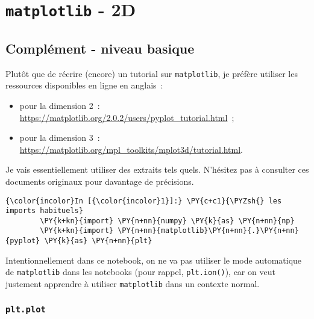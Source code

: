     
    
    
    

    

    \hypertarget{matplotlib---2d}{%
\section{\texorpdfstring{\texttt{matplotlib} -
2D}{matplotlib - 2D}}\label{matplotlib---2d}}

    \hypertarget{compluxe9ment---niveau-basique}{%
\subsection{Complément - niveau
basique}\label{compluxe9ment---niveau-basique}}

    Plutôt que de récrire (encore) un tutorial sur \texttt{matplotlib}, je
préfère utiliser les ressources disponibles en ligne en anglais~:

\begin{itemize}
\tightlist
\item
  pour la dimension 2~:
  \url{https://matplotlib.org/2.0.2/users/pyplot_tutorial.html}~;
\item
  pour la dimension 3~:
  \url{https://matplotlib.org/mpl_toolkits/mplot3d/tutorial.html}.
\end{itemize}

Je vais essentiellement utiliser des extraits tels quels. N'hésitez pas
à consulter ces documents originaux pour davantage de précisions.

    \begin{Verbatim}[commandchars=\\\{\},frame=single,framerule=0.3mm,rulecolor=\color{cellframecolor}]
{\color{incolor}In [{\color{incolor}1}]:} \PY{c+c1}{\PYZsh{} les imports habituels}
        \PY{k+kn}{import} \PY{n+nn}{numpy} \PY{k}{as} \PY{n+nn}{np}
        \PY{k+kn}{import} \PY{n+nn}{matplotlib}\PY{n+nn}{.}\PY{n+nn}{pyplot} \PY{k}{as} \PY{n+nn}{plt}
\end{Verbatim}


    Intentionnellement dans ce notebook, on ne va pas utiliser le mode
automatique de \texttt{matplotlib} dans les notebooks (pour rappel,
\texttt{plt.ion()}), car on veut justement apprendre à utiliser
\texttt{matplotlib} dans un contexte normal.

    \hypertarget{plt.plot}{%
\subsubsection{\texorpdfstring{\texttt{plt.plot}}{plt.plot}}\label{plt.plot}}

